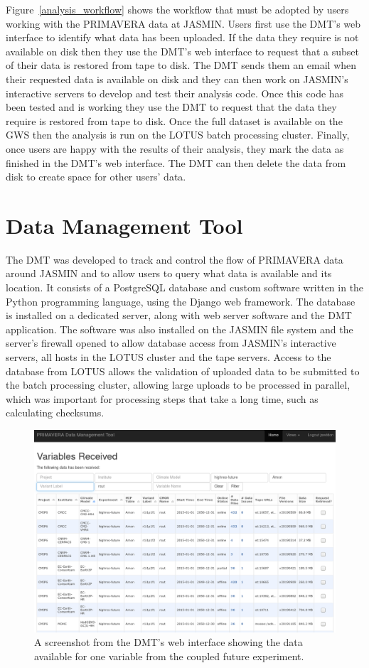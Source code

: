 \documentclass[gmd, manuscript]{copernicus}
\begin{document}
Figure~\ref{analysis_workflow} shows the workflow that must be adopted by users working with the PRIMAVERA data at JASMIN. Users first use the DMT's web interface to identify what data has been uploaded. If the data they require is not available on disk then they use the DMT's web interface to request that a subset of their data is restored from tape to disk. The DMT sends them an email when their requested data is available on disk and they can then work on JASMIN's interactive servers to develop and test their analysis code. Once this code has been tested and is working they use the DMT to request that the data they require is restored from tape to disk. Once the full dataset is available on the GWS then the analysis is run on the LOTUS batch processing cluster. Finally, once users are happy with the results of their analysis, they mark the data as finished in the DMT's web interface. The DMT can then delete the data from disk to create space for other users' data.

\section{Data Management Tool}

The DMT was developed to track and control the flow of PRIMAVERA data around JASMIN and to allow users to query what data is available and its location. It consists of a PostgreSQL database and custom software written in the Python programming language, using the Django web framework. The database is installed on a dedicated server, along with web server software and the DMT application. The software was also installed on the JASMIN file system and the server's firewall opened to allow database access from JASMIN's interactive servers, all hosts in the LOTUS cluster and the tape servers. Access to the database from LOTUS allows the validation of uploaded data to be submitted to the batch processing cluster, allowing large uploads to be processed in parallel, which was important for processing steps that take a long time, such as calculating checksums.

\begin{figure}[t]
	\includegraphics[width=12cm]{fig03.png}
	\caption{A screenshot from the DMT's web interface showing the data available for one variable from the coupled future experiment.}
	\label{dmt_query}
\end{figure}
\end{document}

